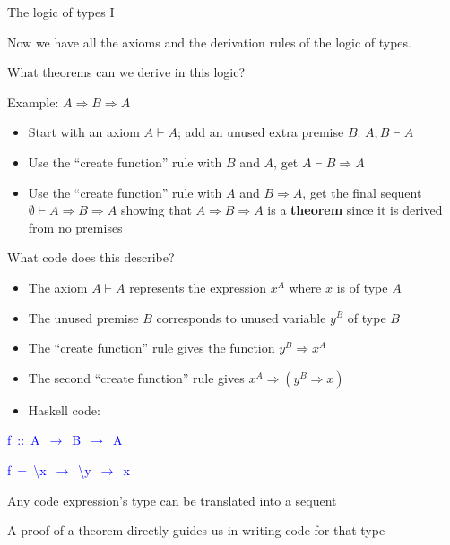 \documentclass[english]{beamer}
\newenvironment{lyxcode}
   {\par\begin{list}{}{
     \setlength{\rightmargin}{\leftmargin}
     \setlength{\listparindent}{0pt}%
     \raggedright
     \setlength{\itemsep}{0pt}
     \setlength{\parsep}{0pt}
     \normalfont\ttfamily}%
    \def\{{\char`\{}
    \def\}{\char`\}}
    \def\textasciitilde{\char`\~}
    \item[]}
   {\end{list}}
\begin{document}
\begin{frame}{The logic of types I}

Now we have all the axioms and the derivation rules of the logic of
types.
\begin{itemize}
\item What theorems can we derive in this logic?
\item Example: $A\Rightarrow B\Rightarrow A$
\begin{itemize}
\item Start with an axiom $A\vdash A$; add an unused extra premise $B$:
$A,B\vdash A$
\item Use the ``create function'' rule with $B$ and $A$, get $A\vdash B\Rightarrow A$
\item Use the ``create function'' rule with $A$ and $B\Rightarrow A$,
get the final sequent $\emptyset\vdash A\Rightarrow B\Rightarrow A$
showing that $A\Rightarrow B\Rightarrow A$ is a \textbf{theorem}
since it is derived from no premises
\end{itemize}
\item What code does this describe?
\begin{itemize}
\item The axiom $A\vdash A$ represents the expression $x^{A}$ where $x$
is of type $A$
\item The unused premise $B$ corresponds to unused variable $y^{B}$ of
type $B$
\item The ``create function'' rule gives the function $y^{B}\Rightarrow x^{A}$
\item The second ``create function'' rule gives $x^{A}\Rightarrow\left(y^{B}\Rightarrow x\right)$
\item Haskell code:
\end{itemize}
\begin{lyxcode}
\textcolor{blue}{\footnotesize{}f~::~A~$\rightarrow$~B~$\rightarrow$~A}{\footnotesize \par}

\textcolor{blue}{\footnotesize{}f~=~\textbackslash{}x~$\rightarrow$~\textbackslash{}y~$\rightarrow$~x}{\footnotesize \par}
\end{lyxcode}
\item Any code expression's type can be translated into a sequent
\item A proof of a theorem directly guides us in writing code for that type
\end{itemize}
\end{frame}
\end{document}
